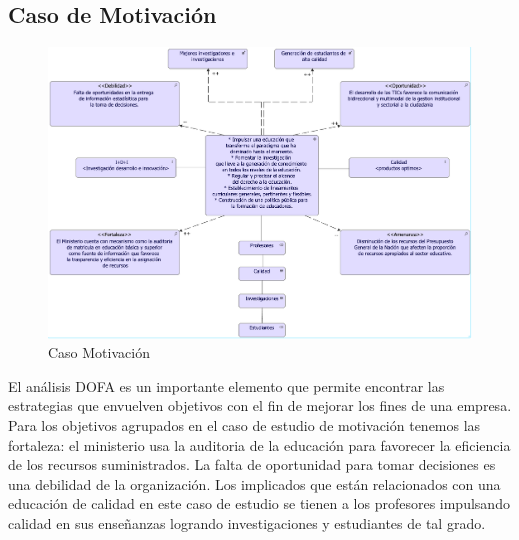 \subsection{Caso  de Motivación}
\begin{figure}[h!]
	\centering
	\includegraphics[width=1.0\linewidth]{imgs/motivacion/motivacion/motivacion}
	\caption{Caso Motivación}
\end{figure}

El análisis DOFA es un importante elemento que permite encontrar las estrategias que envuelven objetivos con el fin de mejorar los fines de una empresa. Para los objetivos agrupados en el caso de estudio de motivación tenemos las fortaleza: el ministerio usa la auditoria de la educación para favorecer la eficiencia de los recursos suministrados. La falta de oportunidad para tomar decisiones es una debilidad de la organización. Los implicados que están relacionados con una educación de calidad en este caso de estudio se tienen a los profesores impulsando calidad en sus enseñanzas logrando investigaciones y estudiantes de tal grado.    
